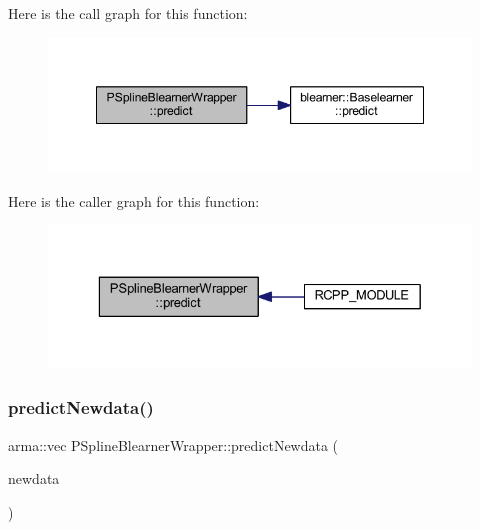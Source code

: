 Here is the call graph for this function\+:
\nopagebreak
\begin{figure}[H]
\begin{center}
\leavevmode
\includegraphics[width=348pt]{class_p_spline_blearner_wrapper_a43a442f80348b28fc40d8e4773678511_cgraph}
\end{center}
\end{figure}
Here is the caller graph for this function\+:
\nopagebreak
\begin{figure}[H]
\begin{center}
\leavevmode
\includegraphics[width=329pt]{class_p_spline_blearner_wrapper_a43a442f80348b28fc40d8e4773678511_icgraph}
\end{center}
\end{figure}
\mbox{\label{class_p_spline_blearner_wrapper_af90fe0fce13519086f8e54fe4d2cc539}} 
\subsubsection{\texorpdfstring{predict\+Newdata()}{predictNewdata()}}
{\footnotesize\ttfamily arma\+::vec P\+Spline\+Blearner\+Wrapper\+::predict\+Newdata (\begin{DoxyParamCaption}\item[{\mbox{\hyperlink{class_data_wrapper}{Data\+Wrapper}} \&}]{newdata }\end{DoxyParamCaption})\hspace{0.3cm}{\ttfamily [inline]}}

